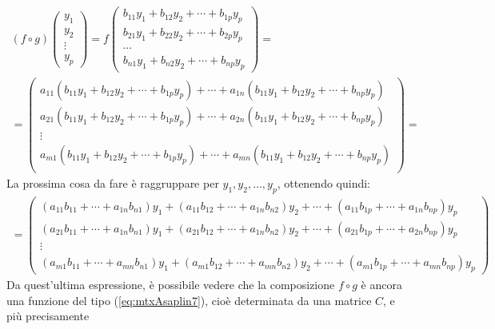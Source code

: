 \documentclass{book}
\theoremstyle{definition}
\theoremstyle{plain}
\begin{document}
\begin{equation}
  \label{eq:Compinveeproddimatrici3}
  \begin{matrix}
    (f\circ g)
    \begin{pmatrix}
      y_1\\
      y_2\\
      \vdots\\
      y_p
    \end{pmatrix}=f
    \begin{pmatrix}
      b_{11}y_1+b_{12}y_2+\cdots+b_{1p}y_p\\
      b_{21}y_1+b_{22}y_2+\cdots+b_{2p}y_p\\
      \cdots\\
      b_{n1}y_1+b_{n2}y_2+\cdots+b_{np}y_p
    \end{pmatrix}=\\
    =\begin{pmatrix}
      a_{11}(b_{11}y_1+b_{12}y_2+\cdots+b_{1p}y_p)+\cdots+a_{1n}(b_{11}y_1+b_{12}y_2+\cdots+b_{np}y_p)\\
      a_{21}(b_{11}y_1+b_{12}y_2+\cdots+b_{1p}y_p)+\cdots+a_{2n}(b_{11}y_1+b_{12}y_2+\cdots+b_{np}y_p)\\
      \vdots\\
      a_{m1}(b_{11}y_1+b_{12}y_2+\cdots+b_{1p}y_p)+\cdots+a_{mn}(b_{11}y_1+b_{12}y_2+\cdots+b_{np}y_p)\\
    \end{pmatrix}=
  \end{matrix}
\end{equation}
La prossima cosa da fare è raggruppare per $y_1,y_2,\dots,y_p$, ottenendo quindi:
\begin{eqnarray*}
  =\begin{pmatrix}
    (a_{11}b_{11}+\cdots+a_{1n}b_{n1})y_1+(a_{11}b_{12}+\cdots+a_{1n}b_{n2})y_2
    +\cdots+(a_{11}b_{1p}+\cdots+a_{1n}b_{np})y_p\\
    (a_{21}b_{11}+\cdots+a_{1n}b_{n1})y_1+(a_{21}b_{12}+\cdots+a_{1n}b_{n2})y_2
    +\cdots+(a_{21}b_{1p}+\cdots+a_{2n}b_{np})y_p\\
    \vdots\\
    (a_{m1}b_{11}+\cdots+a_{mn}b_{n1})y_1+(a_{m1}b_{12}+\cdots+a_{mn}b_{n2})y_2
    +\cdots+(a_{m1}b_{1p}+\cdots+a_{mn}b_{np})y_p
  \end{pmatrix}
\end{eqnarray*}
Da quest'ultima espressione, è possibile vedere che la composizione $f\circ g$ è ancora una funzione
del tipo (\ref{eq:mtxAsaplin7}), cioè determinata da una matrice $C$, e più precisamente
\end{document}
